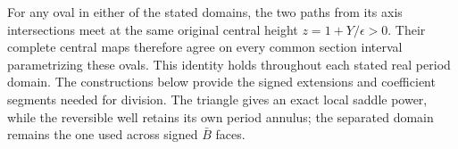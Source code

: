 For any oval in either of the stated domains, the two paths from its
axis intersections meet at the same original central height
$z=1+Y/\epsilon>0$. Their complete central maps therefore agree
on every common section interval parametrizing these ovals.
This identity holds throughout each stated real period domain. The
constructions below provide the signed extensions and coefficient
segments needed for division. The triangle gives an exact local saddle
power, while the reversible well retains its own period annulus; the
separated domain remains the one used across signed $\bar B$ faces.
